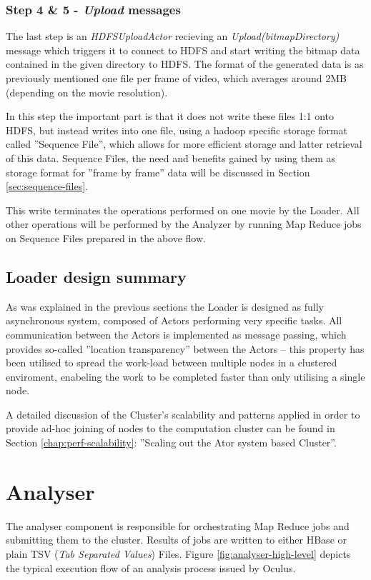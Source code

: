 \subsubsection{Step 4 \& 5 - \textit{Upload} messages}
The last step is an \textit{HDFSUploadActor} recieving an \textit{Upload(bitmapDirectory)} message which triggers it to connect to HDFS and start writing the bitmap data contained in the given directory to HDFS. The format of the generated data is as previously mentioned one file per frame of video, which averages around 2MB (depending on the movie resolution).

In this step the important part is that it does not write these files 1:1 onto HDFS, but instead writes into one file, using a hadoop specific storage format called ''Sequence File'', which allows for more efficient storage and latter retrieval of this data. Sequence Files, the need and benefits gained by using them as storage format for ''frame by frame'' data will be discussed in Section \ref{sec:sequence-files}.

This write terminates the operations performed on one movie by the Loader. All other operations will be performed by the Analyzer by running Map Reduce jobs on Sequence Files prepared in the above flow.

\subsection{Loader design summary}
As was explained in the previous sections the Loader is designed as fully asynchronous system, composed of Actors performing very specific tasks. All communication between the Actors is implemented as message passing, which provides so-called ''location transparency'' between the Actors -- this property has been utilised to spread the work-load between multiple nodes in a clustered enviroment, enabeling the work to be completed faster than only utilising a single node.

A detailed discussion of the Cluster's scalability and patterns applied in order to provide ad-hoc joining of nodes to the computation cluster can be found in Section \ref{chap:perf-scalability}: ''Scaling out the Ator system based Cluster''.

\section{Analyser}
\label{sec:analyser}
The analyser component is responsible for orchestrating Map Reduce jobs and submitting them to the cluster. Results of jobs are written to either HBase or plain TSV (\textit{Tab Separated Values}) Files. Figure \ref{fig:analyser-high-level} depicts the typical execution flow of an analysis process issued by Oculus.

